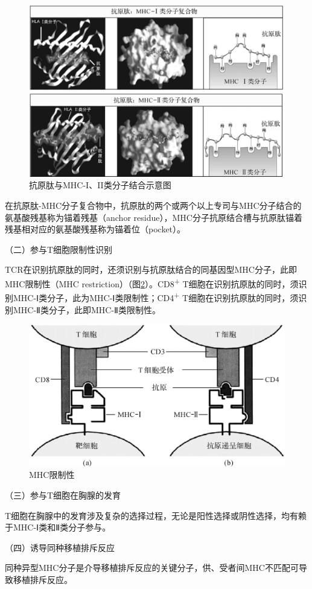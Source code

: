 \begin{figure}[!htbp]
 \centering
 \includegraphics[width=.6\textwidth]{./images/Image00108.jpg}
 \captionsetup{justification=centering}
 \caption{抗原肽与MHC-I、II类分子结合示意图}
 \label{fig7-7}
  \end{figure} 

在抗原肽-MHC分子复合物中，抗原肽的两个或两个以上专司与MHC分子结合的氨基酸残基称为锚着残基（anchor
residue），MHC分子抗原结合槽与抗原肽锚着残基相对应的氨基酸残基称为锚着位（pocket）。

（二）参与T细胞限制性识别

TCR在识别抗原肽的同时，还须识别与抗原肽结合的同基因型MHC分子，此即MHC限制性（MHC
restriction）（图\ref{fig7-8}）。CD8\textsuperscript{+}
T细胞在识别抗原肽的同时，须识别MHC-Ⅰ类分子，此为MHC-Ⅰ类限制性；CD4\textsuperscript{+}
T细胞在识别抗原肽的同时，须识别MHC-Ⅱ类分子，此即MHC-Ⅱ类限制性。

\begin{figure}[!htbp]
 \centering
 \includegraphics[width=.6\textwidth]{./images/Image00109.jpg}
 \captionsetup{justification=centering}
 \caption{MHC限制性}
 \label{fig7-8}
  \end{figure} 

（三）参与T细胞在胸腺的发育

T细胞在胸腺中的发育涉及复杂的选择过程，无论是阳性选择或阴性选择，均有赖于MHC-Ⅰ类和Ⅱ类分子参与。

（四）诱导同种移植排斥反应

同种异型MHC分子是介导移植排斥反应的关键分子，供、受者间MHC不匹配可导致移植排斥反应。

